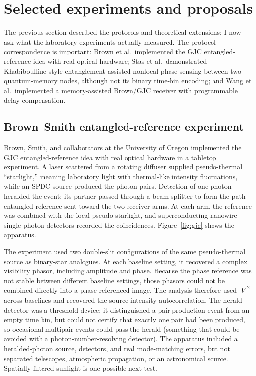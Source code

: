 \documentclass[]{spie}
\newcommand{\etal}{et al.}
\begin{document}
\section{Selected experiments and proposals}
\label{sec:experiments}

The previous section described the protocols and theoretical extensions; I now ask what the laboratory experiments actually measured. The protocol correspondence is important: Brown \etal\ implemented the GJC entangled-reference idea with real optical hardware; Stas \etal\ demonstrated Khabiboulline-style entanglement-assisted nonlocal phase sensing between two quantum-memory nodes, although not its binary time-bin encoding; and Wang \etal\ implemented a memory-assisted Brown/GJC receiver with programmable delay compensation.

\subsection{Brown--Smith entangled-reference experiment}

Brown, Smith, and collaborators at the University of Oregon implemented the GJC entangled-reference idea with real optical hardware in a tabletop experiment.\cite{Brown2023} A laser scattered from a rotating diffuser supplied pseudo-thermal ``starlight,'' meaning laboratory light with thermal-like intensity fluctuations, while an SPDC source produced the photon pairs. Detection of one photon heralded the event; its partner passed through a beam splitter to form the path-entangled reference sent toward the two receiver arms. At each arm, the reference was combined with the local pseudo-starlight, and superconducting nanowire single-photon detectors recorded the coincidences. Figure~\ref{fig:gjc} shows the apparatus.

The experiment used two double-slit configurations of the same pseudo-thermal source as binary-star analogues. At each baseline setting, it recovered a complex visibility phasor, including amplitude and phase. Because the phase reference was not stable between different baseline settings, those phasors could not be combined directly into a phase-referenced image. The analysis therefore used $|V|^2$ across baselines and recovered the source-intensity autocorrelation. The herald detector was a threshold device: it distinguished a pair-production event from an empty time bin, but could not certify that exactly one pair had been produced, so occasional multipair events could pass the herald (something that could be avoided with a photon-number-resolving detector). The apparatus included a heralded-photon source, detectors, and real mode-matching errors, but not separated telescopes, atmospheric propagation, or an astronomical source. Spatially filtered sunlight is one possible next test.
\end{document}
